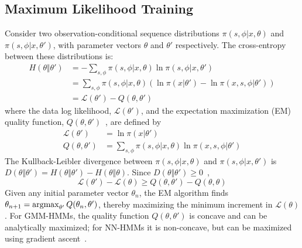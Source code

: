 \subsection{Maximum Likelihood Training}

Consider two observation-conditional sequence distributions
$\pi(s,\phi|x,\theta)$ and $\pi(s,\phi|x,\theta')$, with parameter
vectors $\theta$ and $\theta'$ respectively.  The cross-entropy
between these distributions is:
\begin{align}
  H\left(\theta\Vert\theta'\right) &=
  -\sum_{s,\phi} \pi(s,\phi|x,\theta)
  \ln \pi(s,\phi|x,\theta')\\
  &=   \sum_{s,\phi} \pi(s,\phi|x,\theta)
  \left(\ln \pi(x|\theta')-\ln \pi(x,s,\phi |\theta')\right)\\
  &=  {\mathcal L}\left(\theta'\right)-Q\left(\theta,\theta'\right)
  \label{eq:crossentropy}
\end{align}
where the data log likelihood, ${\mathcal L}\left(\theta'\right)$, and
the expectation maximization (EM) quality function,
$Q\left(\theta,\theta'\right)$~\cite{Dempster77}, are defined by
\begin{align}
  {\mathcal L}\left(\theta'\right) &= \ln \pi(x|\theta')
  \label{eq:loglikelihood}\\
  Q\left(\theta,\theta'\right)
  &=
  \sum_{s,\phi} \pi(s,\phi|x,\theta)\ln \pi(x,s,\phi |\theta')
   \label{eq:Qfunction}
\end{align}
The Kullback-Leibler divergence between $\pi(s,\phi|x,\theta)$ and
$\pi(s,\phi|x,\theta')$ is $D\left(\theta\Vert\theta'\right)=
H\left(\theta\Vert\theta'\right)-H\left(\theta\Vert\theta\right)$.
Since $D\left(\theta\Vert\theta'\right)\ge 0$~\cite{Shannon49},
\begin{equation}
  {\mathcal L}\left(\theta'\right)-{\mathcal L}\left(\theta\right)\ge
  Q\left(\theta,\theta'\right)-
  Q\left(\theta,\theta\right)
  \label{eq:LgeQ}
\end{equation}
Given any initial parameter vector $\theta_n$, the EM
algorithm finds $\theta_{n+1}=\operatorname*{argmax}_{\theta'}
Q(\theta_n,\theta')$, thereby maximizing the minimum increment in
${\mathcal L}(\theta)$.  For GMM-HMMs, the quality function
$Q\left(\theta,\theta'\right)$ is concave and can be analytically
maximized; for NN-HMMs it is non-concave, but can be maximized using
gradient ascent~\cite{Bengio92}.

